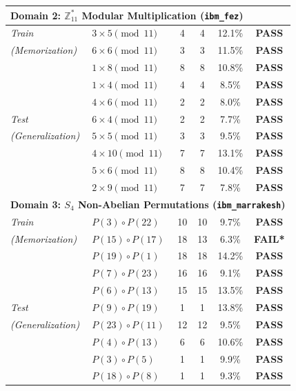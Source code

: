 \documentclass[11pt, a4paper]{article}
\begin{document}
\begin{table}[tb!]
{\begin{tabular}{llcccc}
\midrule
\multicolumn{6}{l}{\textbf{Domain 2: $\mathbb{Z}_{11}^*$ Modular Multiplication (\texttt{ibm\_fez})}} \\
\midrule
\textit{Train}
& $3 \times 5 \pmod{11}$ & 4 & 4 & 12.1\% & \textbf{PASS} \\
\textit{(Memorization)} & $6 \times 6 \pmod{11}$ & 3 & 3 & 11.5\% & \textbf{PASS} \\
& $1 \times 8 \pmod{11}$ & 8 & 8 & 10.8\% & \textbf{PASS} \\
& $1 \times 4 \pmod{11}$ & 4 & 4 & 8.5\%  & \textbf{PASS} \\
& $4 \times 6 \pmod{11}$ & 2 & 2 & 8.0\%  & \textbf{PASS} \\
\midrule
\textit{Test}
& $6 \times 4 \pmod{11}$ & 2 & 2 & 7.7\%  & \textbf{PASS} \\
\textit{(Generalization)} & $5 \times 5 \pmod{11}$ & 3 & 3 & 9.5\%  & \textbf{PASS} \\
& $4 \times 10 \pmod{11}$& 7 & 7 & 13.1\% & \textbf{PASS} \\
& $5 \times 6 \pmod{11}$ & 8 & 8 & 10.4\% & \textbf{PASS} \\
& $2 \times 9 \pmod{11}$ & 7 & 7 & 7.8\%  & \textbf{PASS} \\

\midrule
\multicolumn{6}{l}{\textbf{Domain 3: $S_4$ Non-Abelian Permutations (\texttt{ibm\_marrakesh})}} \\
\midrule
\textit{Train}
& $P(3) \circ P(22)$  & 10 & 10 & 9.7\%  & \textbf{PASS} \\
\textit{(Memorization)} & $P(15) \circ P(17)$ & 18 & 13 & 6.3\%  & \textbf{FAIL*} \\
& $P(19) \circ P(1)$  & 18 & 18 & 14.2\% & \textbf{PASS} \\
& $P(7) \circ P(23)$  & 16 & 16 & 9.1\%  & \textbf{PASS} \\
& $P(6) \circ P(13)$  & 15 & 15 & 13.5\% & \textbf{PASS} \\
\midrule
\textit{Test}
& $P(9) \circ P(19)$  & 1  & 1  & 13.8\% & \textbf{PASS} \\
\textit{(Generalization)} & $P(23) \circ P(11)$ & 12 & 12 & 9.5\%  & \textbf{PASS} \\
& $P(4) \circ P(13)$  & 6  & 6  & 10.6\% & \textbf{PASS} \\
& $P(3) \circ P(5)$   & 1  & 1  & 9.9\%  & \textbf{PASS} \\
& $P(18) \circ P(8)$  & 1  & 1  & 9.3\%  & \textbf{PASS} \\


\end{tabular}}
\end{table}
\end{document}
